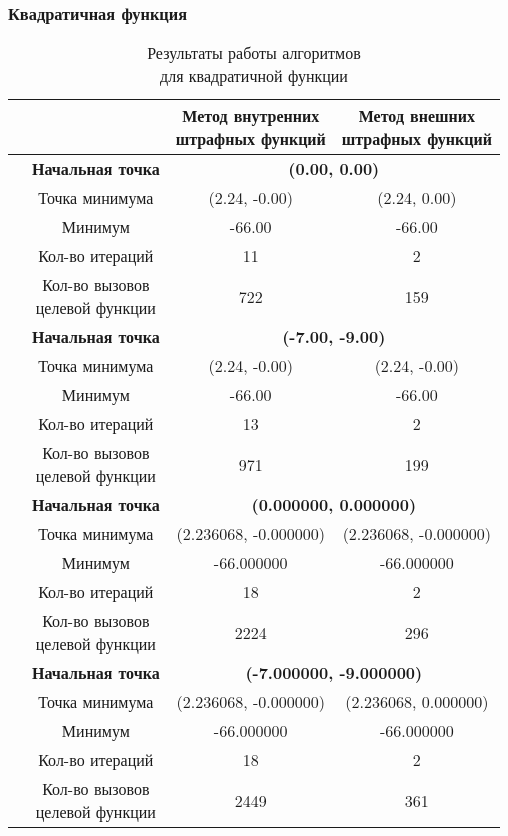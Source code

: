 \subsubsection{Квадратичная функция}

\begin{table}[H]
        \centering
        \vspace*{-1.5em}
        \caption{Результаты работы алгоритмов\\для квадратичной функции}
        \footnotesize
        \begin{tabular}{|c|c|c|c|}
        \hline
        & &\makecell{Метод внутренних\\штрафных функций} &\makecell{Метод внешних\\штрафных функций} \\
        \hline
	\multirow{8}{*}{\rotatebox[origin=c]{90}{$\varepsilon = 0.01$}}&\textbf{Начальная точка} &\multicolumn{2}{c|}{\textbf{(0.00, 0.00)}}\\
	\cline{2-4}
	&Точка минимума &(2.24, -0.00) &(2.24, 0.00) \\ 
	\cline{2-4}
	&Минимум &-66.00 &-66.00 \\ 
	\cline{2-4}
	&Кол-во итераций &11 &2 \\ 
	\cline{2-4}
	&\makecell{Кол-во вызовов\\целевой функции} &722 &159 \\ 
	\cline{2-4}
\cline{2-4}&\textbf{Начальная точка} &\multicolumn{2}{c|}{\textbf{(-7.00, -9.00)}}\\
	\cline{2-4}
	&Точка минимума &(2.24, -0.00) &(2.24, -0.00) \\ 
	\cline{2-4}
	&Минимум &-66.00 &-66.00 \\ 
	\cline{2-4}
	&Кол-во итераций &13 &2 \\ 
	\cline{2-4}
	&\makecell{Кол-во вызовов\\целевой функции} &971 &199 \\ 
	\cline{2-4}
	\hline
	\multirow{8}{*}{\rotatebox[origin=c]{90}{$\varepsilon = 1e-06$}}&\textbf{Начальная точка} &\multicolumn{2}{c|}{\textbf{(0.000000, 0.000000)}}\\
	\cline{2-4}
	&Точка минимума &(2.236068, -0.000000) &(2.236068, -0.000000) \\ 
	\cline{2-4}
	&Минимум &-66.000000 &-66.000000 \\ 
	\cline{2-4}
	&Кол-во итераций &18 &2 \\ 
	\cline{2-4}
	&\makecell{Кол-во вызовов\\целевой функции} &2224 &296 \\ 
	\cline{2-4}
\cline{2-4}&\textbf{Начальная точка} &\multicolumn{2}{c|}{\textbf{(-7.000000, -9.000000)}}\\
	\cline{2-4}
	&Точка минимума &(2.236068, -0.000000) &(2.236068, 0.000000) \\ 
	\cline{2-4}
	&Минимум &-66.000000 &-66.000000 \\ 
	\cline{2-4}
	&Кол-во итераций &18 &2 \\ 
	\cline{2-4}
	&\makecell{Кол-во вызовов\\целевой функции} &2449 &361 \\ 
	\cline{2-4}
	\hline


\end{tabular}
\end{table}
